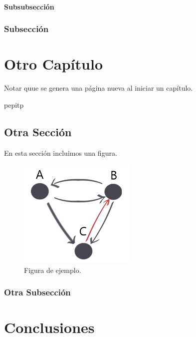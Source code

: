 \documentclass[12pt,a4paper,oneside]{book}
\begin{document}
\lipsum[4]


\subsubsection{Subsubsección}

\lipsum[5]

\subsection{Subsección}

\lipsum[6]



\chapter{Otro Capítulo}

Notar quue se genera una página nueva al iniciar un capítulo.

pepitp
\section{Otra Sección}

En esta sección incluimos una figura.
\begin{figure}[ht]
 \centering
 \includegraphics[width=0.5\textwidth]{grafo.png}
 \caption{Figura de ejemplo.}
 \label{fig1}
\end{figure}

\subsection{Otra Subsección}
\lipsum[2-5]

\chapter{Conclusiones}
\lipsum[1-6]
\end{document}

